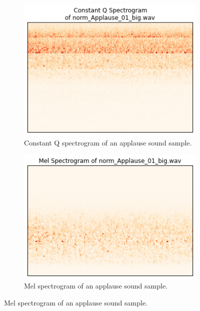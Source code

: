 \documentclass{sig-alternate-05-2015}
\begin{document}
  \begin{figure}[hbt]
    \centering
    \begin{subfigure}[b]{0.45\textwidth}
      \centering
      \includegraphics[width=\textwidth]{figures/cqt_applause.png}
      \caption{Constant Q spectrogram of an applause sound sample.}
      \label{fig:cqt-applause}
    \end{subfigure}
    \hfill 
    \begin{subfigure}[b]{0.45\textwidth}
      \centering
      \includegraphics[width=\textwidth]{figures/mel_applause.png}
      \caption{Mel spectrogram of an applause sound sample.}
      \label{fig:cqt-applause}
    \end{subfigure}
  \end{figure}
  
\end{document}
